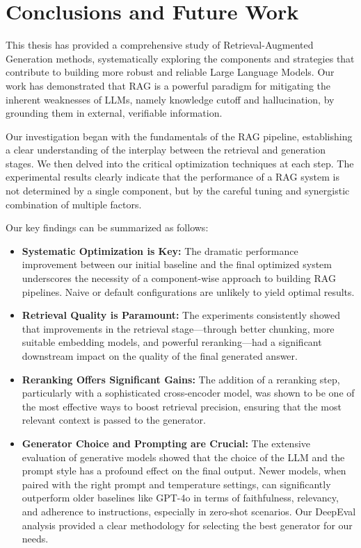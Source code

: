 \chapter{Conclusions and Future Work}
\label{chap:conclusions}

This thesis has provided a comprehensive study of Retrieval-Augmented Generation methods, systematically exploring the components and strategies that contribute to building more robust and reliable Large Language Models. Our work has demonstrated that RAG is a powerful paradigm for mitigating the inherent weaknesses of LLMs, namely knowledge cutoff and hallucination, by grounding them in external, verifiable information.

Our investigation began with the fundamentals of the RAG pipeline, establishing a clear understanding of the interplay between the retrieval and generation stages. We then delved into the critical optimization techniques at each step. The experimental results clearly indicate that the performance of a RAG system is not determined by a single component, but by the careful tuning and synergistic combination of multiple factors. 

Our key findings can be summarized as follows:
\begin{itemize}
    \item \textbf{Systematic Optimization is Key:} The dramatic performance improvement between our initial baseline and the final optimized system underscores the necessity of a component-wise approach to building RAG pipelines. Naive or default configurations are unlikely to yield optimal results.
    \item \textbf{Retrieval Quality is Paramount:} The experiments consistently showed that improvements in the retrieval stage—through better chunking, more suitable embedding models, and powerful reranking—had a significant downstream impact on the quality of the final generated answer.
    \item \textbf{Reranking Offers Significant Gains:} The addition of a reranking step, particularly with a sophisticated cross-encoder model, was shown to be one of the most effective ways to boost retrieval precision, ensuring that the most relevant context is passed to the generator.
    \item \textbf{Generator Choice and Prompting are Crucial:} The extensive evaluation of generative models showed that the choice of the LLM and the prompt style has a profound effect on the final output. Newer models, when paired with the right prompt and temperature settings, can significantly outperform older baselines like GPT-4o in terms of faithfulness, relevancy, and adherence to instructions, especially in zero-shot scenarios. Our DeepEval analysis provided a clear methodology for selecting the best generator for our needs.
\end{itemize}

